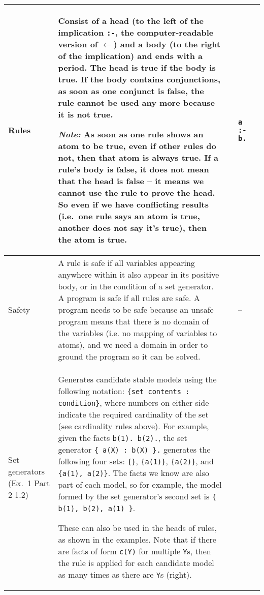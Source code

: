 \documentclass[9pt,a4paper,landscape]{article}
\begin{document}
{\begin{longtable}{Lp{14.5cm}lXX}
Rules
& Consist of a head (to the left of the implication \texttt{:-}, the computer-readable version of $\leftarrow$) and a body (to the right of the implication) and ends with a period.
The head is true if the body is true.
If the body contains conjunctions, as soon as one conjunct is false, the rule cannot be used any more because it is not true. \newline

\textit{Note:} As soon as one rule shows an atom to be true, even if other rules do not, then that atom is always true. 
If a rule's body is false, it does not mean that the head is false -- it means we cannot use the rule to prove the head.
So even if we have conflicting results (i.e.\ one rule says an atom is true, another does not say it's true), then the atom is true.
&& \texttt{a :- b.} &\\ \midrule

Safety
&  A rule is safe if all variables appearing anywhere within it also appear in its positive body, or in the condition of a set generator. 
A program is safe if all rules are safe.
A program needs to be safe because an unsafe program means that there is no domain of the variables (i.e. no mapping of variables to atoms), and we need a domain in order to ground the program so it can be solved.
&& -- &\\ \midrule	

Set generators \newline (Ex.\ 1 Part 2 1.2)
& Generates candidate stable models using the following notation: \texttt{\{set contents : condition\}}, where numbers on either side indicate the required cardinality of the set (see cardinality rules above).
For example, given the facts \texttt{b(1). b(2).}, the set generator \texttt{\{ a(X) : b(X) \}.} generates the following four sets: \texttt{\{\}}, \texttt{\{a(1)\}}, \texttt{\{a(2)\}}, and \texttt{\{a(1), a(2)\}}.
The facts we know are also part of each model, so for example, the model formed by the set generator's second set is \texttt{\{ b(1), b(2), a(1) \}}. \newline

These can also be used in the heads of rules, as shown in the examples. 
Note that if there are facts of form \texttt{c(Y)} for multiple \texttt{Y}s, then the rule is applied for each candidate model as many times as there are \texttt{Y}s (right).


\end{longtable}}
\end{document}
